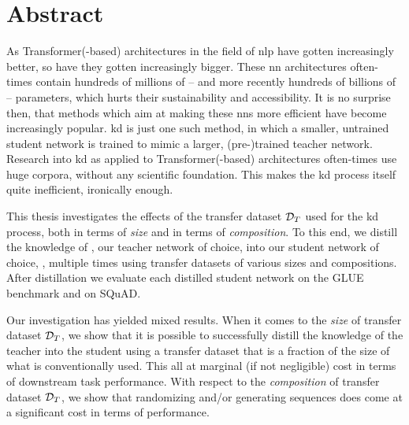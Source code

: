 \chapter*{Abstract}
\glsresetall
As Transformer(-based) architectures in the field of \gls{nlp} have gotten increasingly better, so have they gotten increasingly bigger. These \gls{nn} architectures often-times contain hundreds of millions of -- and more recently hundreds of billions of -- parameters, which hurts their sustainability and accessibility. It is no surprise then, that methods which aim at making these \glspl{nn} more efficient have become increasingly popular. \gls{kd} is just one such method, in which a smaller, untrained student network is trained to mimic a larger, (pre-)trained teacher network. Research into \gls{kd} as applied to Transformer(-based) architectures often-times use huge corpora, without any scientific foundation. This makes the \gls{kd} process itself quite inefficient, ironically enough.

This thesis investigates the effects of the transfer dataset $\mathcal{D}_T$ used for the \gls{kd} process, both in terms of \emph{size} and in terms of \emph{composition}. To this end, we distill the knowledge of \bertbase, our teacher network of choice, into our student network of choice, \bertstudent, multiple times using transfer datasets of various sizes and compositions. After distillation we evaluate each distilled student network on the GLUE benchmark and on SQuAD.

Our investigation has yielded mixed results. When it comes to the \emph{size} of transfer dataset $\mathcal{D}_T$, we show that it is possible to successfully distill the knowledge of the teacher into the student using a transfer dataset that is a fraction of the size of what is conventionally used. This all at marginal (if not negligible) cost in terms of downstream task performance. With respect to the \emph{composition} of transfer dataset $\mathcal{D}_T$, we show that randomizing and/or generating sequences does come at a significant cost in terms of performance.